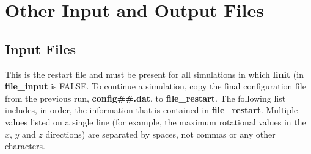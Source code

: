 \documentclass[12pt,letterpaper]{article}
\begin{document}
\section{Other Input and Output Files}

\subsection{Input Files}

 This is the restart file and
must be present for all simulations in which {\bf linit} (in
{\bf file\_input} is FALSE. To continue a simulation, copy
the final configuration file from the previous run, {\bf
  config\#\#.dat}, to {\bf file\_restart}. The following
list includes, in order, the information that is contained
in {\bf file\_restart}. Multiple values listed on a single
line (for example, the maximum rotational values in the $x$,
$y$ and $z$ directions) are separated by spaces, not commas
or any other characters.
\end{document}
